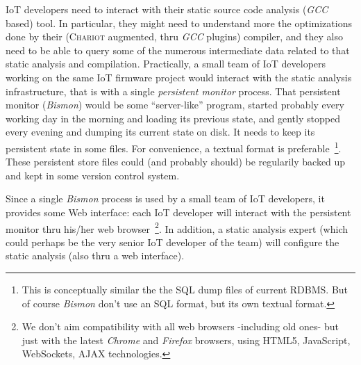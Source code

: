 IoT developers need to interact with their static source code analysis
(\emph{GCC} based) tool. In particular, they might need to understand
more the optimizations done by their (\textsc{Chariot} augmented, thru
\emph{GCC} plugins) compiler, and they also need to be able to query
some of the numerous intermediate data related to that static analysis
and compilation. Practically, a small team of IoT developers working
on the same IoT firmware project would interact with the static
analysis infrastructure, that is with a single \emph{persistent
  monitor} process. That persistent monitor (\emph{Bismon}) would be
some ``server-like'' program, started probably every working day in
the morning and loading its previous state, and gently stopped every
evening and dumping its current state on disk. It needs to keep its
persistent state in some files. For convenience, a textual format is
preferable~\footnote{This is conceptually similar the the SQL dump
  files of current RDBMS. But of course \emph{Bismon} don't use an SQL
  format, but its own textual format.}. These persistent store files
could (and probably should) be regularily backed up and kept in some
version control system.

Since a single \emph{Bismon} process is used by a small team of IoT
developers, it provides some Web interface: each IoT developer will
interact with the persistent monitor thru his/her web
browser~\footnote{We don't aim compatibility with all web browsers
  -including old ones- but just with the latest \emph{Chrome} and
  \emph{Firefox} browsers, using HTML5, JavaScript, WebSockets, AJAX
  technologies.}. In addition, a static analysis expert (which could
perhaps be the very senior IoT developer of the team) will configure
the static analysis (also thru a web interface).

